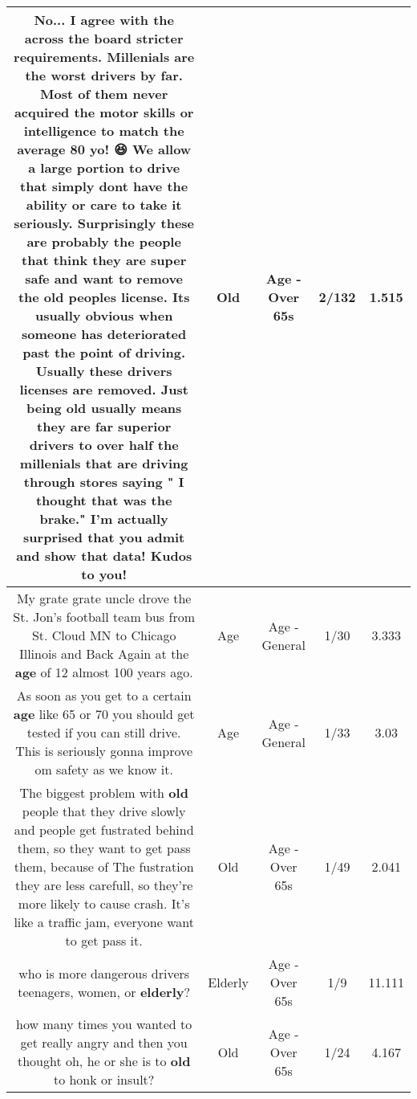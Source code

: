\documentclass[11pt]{article}
\newlength\mylength
\begin{document}
\begin{center}
\begin{longtable}{|C{.65\mylength}|C{.30\mylength}|C{.12\mylength}|C{.12\mylength}|C{.12\mylength}|}
  \small No... I agree with the across the board stricter requirements. Millenials are the worst drivers by far. Most of them never acquired the motor skills or intelligence to match the average 80 yo! 😆 We allow a large portion to drive that simply dont have the ability or care to take it seriously. Surprisingly these are probably the people that think they are super safe and want to remove the \textbf{old} peoples license.  Its usually obvious when someone has deteriorated past the point of driving. Usually these drivers licenses are removed. Just being \textbf{old} usually means they are far superior drivers to over half the millenials that are driving through stores saying " I thought that was the brake." I'm actually surprised that you admit and show that data! Kudos to you!\normalsize   & Old & Age - Over 65s & 2/132 & 1.515 \\  \hline
  \small My grate grate uncle drove the St. Jon's football team bus from St. Cloud  MN to Chicago Illinois and Back Again at the \textbf{age} of 12 almost 100 years ago.\normalsize   & Age & Age - General & 1/30 & 3.333 \\  \hline
  \small As soon as you get to a certain \textbf{age} like 65 or 70 you should get tested if you can still drive. This is seriously gonna improve om safety as we know it.\normalsize   & Age & Age - General & 1/33 & 3.03 \\  \hline
  \small The biggest problem with \textbf{old} people that they drive slowly and people get fustrated behind them, so they want to get pass them, because of The fustration they are less carefull, so they're more likely to cause crash.  It's like a traffic jam, everyone want to get pass it.\normalsize   & Old & Age - Over 65s & 1/49 & 2.041 \\  \hline
  \small who is more dangerous drivers teenagers, women, or \textbf{elderly}?\normalsize   & Elderly & Age - Over 65s & 1/9 & 11.111 \\  \hline
  \small how many times you wanted to get really angry and then you thought oh, he or she is to \textbf{old} to honk or insult?\normalsize   & Old & Age - Over 65s & 1/24 & 4.167 \\  \hline

\end{longtable}
\end{center}
\end{document}
